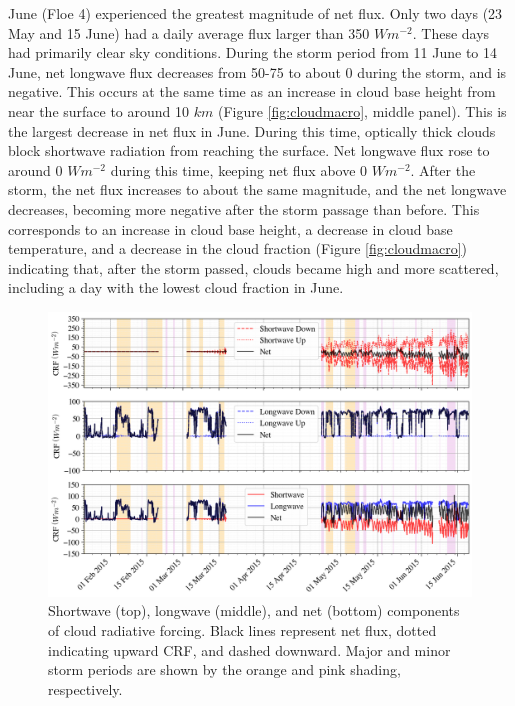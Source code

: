 June (Floe 4) experienced the greatest magnitude of net flux. Only two days (23 May and 15 June) had a daily average flux larger than 350 $Wm^{-2}$. These days had primarily clear sky conditions. During the storm period from 11 June to 14 June, net longwave flux decreases from 50-75 to about 0 during the storm, and is negative. This occurs at the same time as an increase in cloud base height from near the surface to around 10 $km$ (Figure \ref{fig:cloudmacro}, middle panel). This is the largest decrease in net flux in June. During this time, optically thick clouds block shortwave radiation from reaching the surface. Net longwave flux rose to around 0 $Wm^{-2}$ during this time, keeping net flux above 0 $Wm^{-2}$. After the storm, the net flux increases to about the same magnitude, and the net longwave decreases, becoming more negative after the storm passage than before. This corresponds to an increase in cloud base height, a decrease in cloud base temperature, and a decrease in the cloud fraction (Figure \ref{fig:cloudmacro}) indicating that, after the storm passed, clouds became high and more scattered, including a day with the lowest cloud fraction in June. 

\begin{figure}[t!]
    \centering
    \includegraphics[width=1\linewidth]{figures/chapter4/RadForcing.png}
    \caption[Shortwave, longwave, and net components of cloud radiative forcing.]{Shortwave (top), longwave (middle), and net (bottom) components of cloud radiative forcing. Black lines represent net flux, dotted indicating upward CRF, and dashed downward. Major and minor storm periods are shown by the orange and pink shading, respectively.}
    \label{fig:crf_timeseries}
\end{figure}

